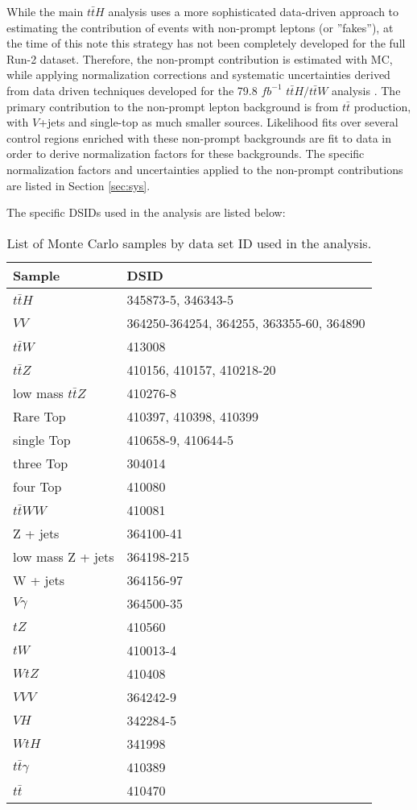 While the main $t\bar{t}H$ analysis uses a more sophisticated data-driven approach to estimating the contribution of events with non-prompt leptons (or ''fakes''), at the time of this note this strategy has not been completely developed for the full Run-2 dataset. Therefore, the non-prompt contribution is estimated with MC, while applying normalization corrections and systematic uncertainties derived from data driven techniques developed for the 79.8 $fb^{-1}$ $t\bar{t}H/t\bar{t}W$ analysis \cite{ttH_paper}. The primary contribution to the non-prompt lepton background is from $t\bar{t}$ production, with $V$+jets and single-top as much smaller sources. Likelihood fits over several control regions enriched with these non-prompt backgrounds are fit to data in order to derive normalization factors for these backgrounds. The specific normalization factors and uncertainties applied to the non-prompt contributions are listed in Section \ref{sec:sys}.

The specific DSIDs used in the analysis are listed below:

\begin{table}[H]
    \centering
    \begin{tabular}{l|l}
        \hline\hline
        Sample & DSID \\
        \hline\hline
        $t\bar{t}H$ & 345873-5, 346343-5 \\ 
        $VV$ & 364250-364254, 364255, 363355-60, 364890 \\
        $t\bar{t}W$ & 413008 \\
        $t\bar{t}Z$ & 410156, 410157, 410218-20 \\
        low mass $t\bar{t}Z$ & 410276-8 \\
        Rare Top & 410397, 410398, 410399 \\
        single Top & 410658-9, 410644-5 \\
        three Top & 304014 \\
        four Top & 410080 \\
        $t\bar{t}WW$ & 410081 \\
        Z + jets & 364100-41 \\
        low mass Z + jets & 364198-215 \\
        W + jets & 364156-97 \\
        $V\gamma$ & 364500-35 \\
        $tZ$  & 410560 \\
        $tW$  & 410013-4 \\
        $WtZ$ & 410408 \\
        $VVV$ & 364242-9 \\
        $VH$ & 342284-5 \\
        $WtH$ & 341998 \\
        $t\bar{t}\gamma$ & 410389 \\
        $t\bar{t}$ & 410470 \\
        \hline\hline
    \end{tabular}
    \caption{List of Monte Carlo samples by data set ID used in the analysis.}
    \label{tbl:dsids}
\end{table}
